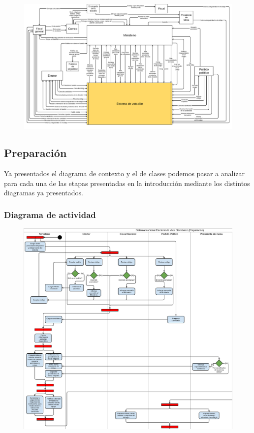 \begin{figure}[h!]
\centering
\includegraphics[scale=0.28]{imagenes/contexto2}
\end{figure}

\newpage


\newpage

\subsection{Preparación}

Ya presentados el diagrama de contexto y el de clases podemos pasar a analizar para cada una de las etapas presentadas en la introducción mediante los distintos diagramas ya presentados.

\subsubsection{Diagrama de actividad}


\begin{figure}[h!]
\centering
\includegraphics[scale=0.5]{imagenes/actividad/actividadPreparacion1}
\end{figure}

